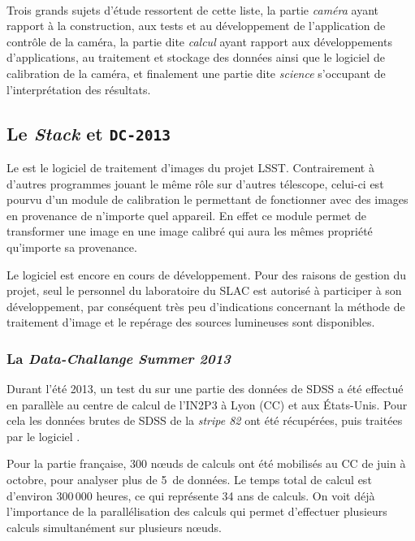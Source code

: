 	\

Trois grands sujets d'étude ressortent de cette liste, la partie \emph{caméra} ayant rapport à la construction, aux tests et au développement de l'application de contrôle de la caméra, la partie dite \emph{calcul} ayant rapport aux développements d'applications, au traitement et stockage des données ainsi que le logiciel de calibration de la caméra, et finalement une partie dite \emph{science} s'occupant de l'interprétation des résultats.

	\subsection{Le \emph{Stack} et \texttt{DC-2013}}

Le \stack{} est le logiciel de traitement d'images du projet LSST. Contrairement à d'autres programmes jouant le même rôle sur d'autres télescope, celui-ci est pourvu d'un module de calibration le permettant de fonctionner avec des images en provenance de n'importe quel appareil. En effet ce module permet de transformer une image en une image calibré qui aura les mêmes propriété qu'importe sa provenance.

Le logiciel \stack{} est encore en cours de développement. Pour des raisons de gestion du projet, seul le personnel du laboratoire du SLAC est autorisé à participer à son développement, par conséquent très peu d'indications concernant la méthode de traitement d'image et le repérage des sources lumineuses sont disponibles.


		\subsubsection{La \emph{Data-Challange Summer 2013}}

Durant l'été 2013, un test du \stack{} sur une partie des données de SDSS a été effectué en parallèle au centre de calcul de l'IN2P3 à Lyon (CC) et aux États-Unis. Pour cela les données brutes de SDSS de la \emph{stripe 82} ont été récupérées, puis traitées par le logiciel \stack.

Pour la partie française, 300 nœuds de calculs ont été mobilisés au CC de juin à octobre, pour analyser plus de 5\,\To{} de données. Le temps total de calcul est d'environ 300\,000 heures, ce qui représente 34 ans de calculs. On voit déjà l'importance de la parallélisation des calculs qui permet d'effectuer plusieurs calculs simultanément sur plusieurs nœuds.


